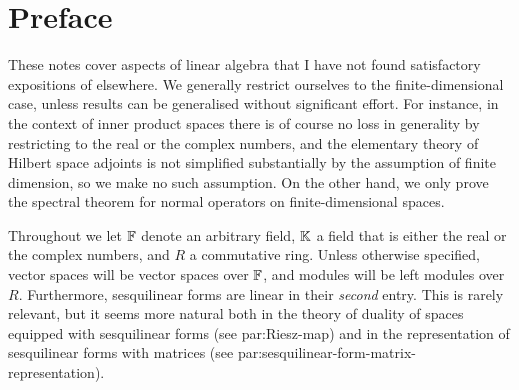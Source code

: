 \chapter{Preface}

These notes cover aspects of linear algebra that I have not found satisfactory expositions of elsewhere. We generally restrict ourselves to the finite-dimensional case, unless results can be generalised without significant effort. For instance, in the context of inner product spaces there is of course no loss in generality by restricting to the real or the complex numbers, and the elementary theory of Hilbert space adjoints is not simplified substantially by the assumption of finite dimension, so we make no such assumption. On the other hand, we only prove the spectral theorem for normal operators on finite-dimensional spaces.

Throughout we let $\mathbb{F}$ denote an arbitrary field, $\mathbb{K}$ a field that is either the real or the complex numbers, and $R$ a commutative ring. Unless otherwise specified, vector spaces will be vector spaces over $\mathbb{F}$, and modules will be left modules over $R$. Furthermore, sesquilinear forms are linear in their \emph{second} entry. This is rarely relevant, but it seems more natural both in the theory of duality of spaces equipped with sesquilinear forms (see {par:Riesz-map}) and in the representation of sesquilinear forms with matrices (see {par:sesquilinear-form-matrix-representation}).